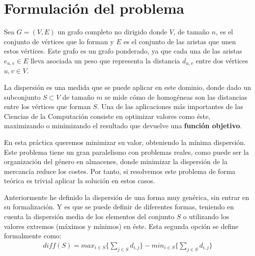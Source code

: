 \clearpage
\maketitle %
\thispagestyle{empty}

\newpage %

\tableofcontents %

\newpage




\part{Formulación del problema}

Sea $G = (V,E)$ un grafo completo no dirigido donde $V$, de tamaño $n$, es el conjunto de vértices que lo forman y $E$ es el conjunto de las aristas que unen estos vértices. Este grafo es un grafo ponderado, ya que cada una de las aristas $e_{u,v} \in E$ lleva asociada un peso que representa la distancia $d_{u,v}$ entre dos vértices $u,v \in V$.

La dispersión es una medida que se puede aplicar en este dominio, donde dado un subconjunto $S \subset V$ de tamaño $m$ se mide cómo de homogéneas son las distancias entre los vértices que forman $S$. Una de las aplicaciones más importantes de las Ciencias de la Computación consiste en optimizar valores como éste, maximizando o minimizando el resultado que devuelve una \textbf{función objetivo}. 

En esta práctica queremos minimizar su valor, obteniendo la mínima dispersión. Este problema tiene un gran paralelismo con problemas reales, como puede ser la organización del género en almacenes, donde minimizar la dispersión de la mercancía reduce los costes. Por tanto, si resolvemos este problema de forma teórica es trivial aplicar la solución en estos casos.

Anteriormente he definido la dispersión de una forma muy genérica, sin entrar en su formalización. Y es que se puede definir de diferentes formas, teniendo en cuenta la dispersión media de los elementos del conjunto $S$ o utilizando los valores extremos (máximos y mínimos) en éste. Esta segunda opción se define formalmente como:
\begin{align*}
    diff(S) = max_{i \in S} \{ \sum_{j \in S} d_{i,j}\} - min_{i \in S} \{ \sum_{j \in S} d_{i,j}\}
\end{align*}

